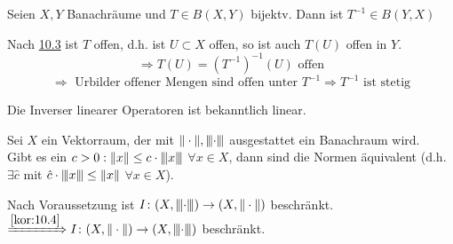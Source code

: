\begin{kor} \label{kor:10.4}
	Seien $X, Y$ Banachräume und $T \in B(X, Y)$ bijektv. Dann ist $T^{-1} \in B(Y, X)$	
\end{kor}

\begin{beweis}
	Nach \hyperref[satz:10.3-offeneAbbildung]{10.3} ist $T$ offen, d.h. ist $U \subset X$ offen, so ist auch $T(U)$ offen in $Y$. \\
	\[ \Rightarrow T(U) = \left( T^{-1} \right)^{-1}(U) \text{ offen} \]
	\[ \Rightarrow \text{ Urbilder offener Mengen sind offen unter } T^{-1} \Rightarrow T^{-1} \text{ ist stetig} \] 
	
	Die Inverser linearer Operatoren ist bekanntlich linear.	
\end{beweis}


\begin{kor} \label{kor:10.5}
	Sei $X$	ein Vektorraum, der mit $\| \cdot \|, {\left\vert\kern-0.25ex\left\vert\kern-0.25ex\left\vert\cdot\right\vert\kern-0.25ex\right\vert\kern-0.25ex\right\vert}$ ausgestattet ein Banachraum wird. \\
	Gibt es ein $c > 0: \| x \| \leq c \cdot {\left\vert\kern-0.25ex\left\vert\kern-0.25ex\left\vert x\right\vert\kern-0.25ex\right\vert\kern-0.25ex\right\vert}$ $\forall x \in X$, dann sind die Normen äquivalent (d.h. $\exists \hat{c} $ mit $\hat{c} \cdot {\left\vert\kern-0.25ex\left\vert\kern-0.25ex\left\vert x\right\vert\kern-0.25ex\right\vert\kern-0.25ex\right\vert} \leq \| x \|$ $\forall x \in X$). 
\end{kor}

\begin{beweis}
	Nach Voraussetzung ist $I \colon (X, {\left\vert\kern-0.25ex\left\vert\kern-0.25ex\left\vert\cdot\right\vert\kern-0.25ex\right\vert\kern-0.25ex\right\vert}) \rightarrow (X, \| \cdot \|)$ beschränkt. \\
	$\xRightarrow[]{\ref{kor:10.4}} I \colon (X, \| \cdot \|) \rightarrow (X, {\left\vert\kern-0.25ex\left\vert\kern-0.25ex\left\vert\cdot\right\vert\kern-0.25ex\right\vert\kern-0.25ex\right\vert})$ beschränkt.
\end{beweis}



\newpage